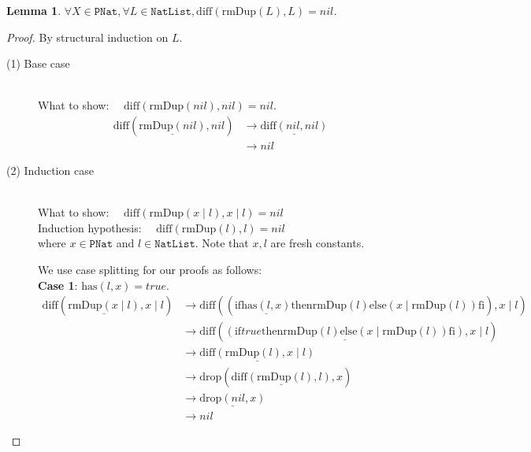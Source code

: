 \documentclass[12pt, a4paper]{article}
\newtheorem{lemma}[theorem]{Lemma}
\newcommand{\rel}[1]{\mathrel{#1}}
\newcommand{\rmx}[1]{\mathrm{#1}}
\newcommand{\larrow}{\longrightarrow}
\newcommand{\under}{\underline}
\begin{document}
\begin{lemma}
\label{lm2}
$\forall X \in \mathtt{PNat}, \forall L \in \mathtt{NatList}, \rmx{diff}(\rmx{rmDup}(L), L) = nil$.
\end{lemma}
\begin{proof}
By structural induction on $L$.
\begin{description}
\item[(1) Base case]~\\
\noindent
What to show: $\quad \rmx{diff}(\rmx{rmDup}(nil), nil) = nil$.
\begin{align*}
\rmx{diff}(\under{\rmx{rmDup}(nil)}, nil)
	&\larrow \under{\rmx{diff}(nil, nil)} \tag{by rmDup1} \\
	&\larrow nil \tag{by diff1}	
\end{align*}
\item[(2) Induction case]~\\
What to show: $\quad \rmx{diff}(\rmx{rmDup}(x \mid l), x \mid l) = nil$\\
Induction hypothesis: $\quad \rmx{diff}(\rmx{rmDup}(l), l) = nil$  \\
where $x \in \mathtt{PNat}$ and $l \in \mathtt{NatList}$.
Note that $x, l$ are fresh constants.

We use case splitting for our proofs as follows: \\
\textbf{Case 1}: $\rmx{has}(l, x) = true$.
\begin{align*}
\rmx{diff}(\under{\rmx{rmDup}(x \mid l)}, x \mid l)
	&\larrow \rmx{diff}((\rel{\rmx{if}} \under{\rmx{has}(l, x)} \rel{\rmx{then}} \rmx{rmDup}(l) \rel{\rmx{else}} (x \mid \rmx{rmDup}(l)) \rel{\rmx{fi}}), x \mid l) \tag{by rmDup2} \\
	&\larrow \rmx{diff}(\under{(\rel{\rmx{if}} true \rel{\rmx{then}} \rmx{rmDup}(l) \rel{\rmx{else}} (x \mid \rmx{rmDup}(l)) \rel{\rmx{fi}})}, x \mid l) \tag{by case splitting} \\
	&\larrow \under{\rmx{diff}(\rmx{rmDup}(l), x \mid l)} \tag{by if1} \\
	&\larrow \rmx{drop}(\under{\rmx{diff}(\rmx{rmDup}(l), l)}, x) \tag{by Problem 14} \\
	&\larrow \under{\rmx{drop}(nil, x)} \tag{by IH} \\
	&\larrow nil \tag{by drop1}
\end{align*}


\end{description}
\end{proof}
\end{document}

